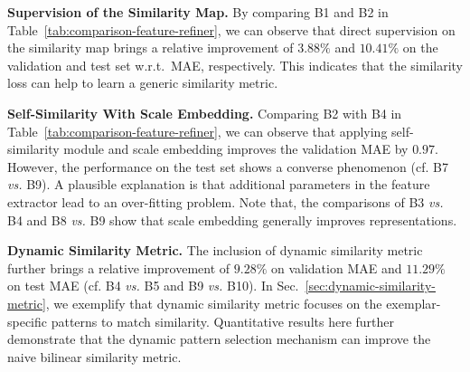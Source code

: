 \documentclass[10pt,twocolumn,letterpaper]{article}
\newcommand{\margin}{\vspace{3pt}\noindent}
\begin{document}
\margin
\textbf{Supervision of the Similarity Map.}
By comparing B1 and B2 in Table~\ref{tab:comparison-feature-refiner}, we can observe that direct supervision on the similarity map brings a relative improvement of $3.88\%$ and $10.41\%$ on the validation and test set w.r.t.\ MAE, respectively. This indicates that the similarity loss can help to learn a generic similarity metric. 

\margin
\textbf{Self-Similarity With Scale Embedding.}
Comparing B2 with B4 in Table~\ref{tab:comparison-feature-refiner}, we can observe that applying self-similarity module and scale embedding improves the validation MAE by $0.97$. However, the performance on the test set shows a converse phenomenon (cf. B7 \textit{vs.} B9). A plausible explanation is that additional parameters in the feature extractor lead to an over-fitting problem. Note that, the comparisons of B3 \textit{vs.} B4 and B8 \textit{vs.} B9 show that scale embedding generally improves representations.

\margin
\textbf{Dynamic Similarity Metric.}
The inclusion of dynamic similarity metric further brings a relative improvement of $9.28\%$ on validation MAE and $11.29\%$ on test MAE (cf. B4 \textit{vs.} B5 and B9 \textit{vs.} B10). In Sec.~\ref{sec:dynamic-similarity-metric}, we exemplify that dynamic similarity metric focuses on the exemplar-specific patterns to match similarity. Quantitative results here further demonstrate that the dynamic pattern selection mechanism can improve the naive bilinear similarity metric. 
\end{document}
